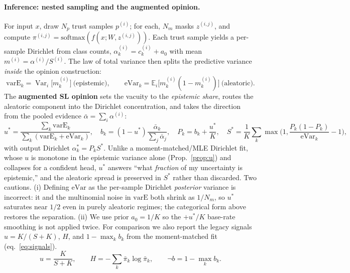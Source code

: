 \documentclass[11pt]{article}
\newcommand{\Eb}{\mathbb{E}}
\newcommand{\Var}{\operatorname{Var}}
\begin{document}
\paragraph{Inference: nested sampling and the augmented opinion.}
For input $x$, draw $N_p$ trust samples $p^{(i)}$; for each, $N_m$ masks $z^{(i,j)}$, and
compute $\pi^{(i,j)}=\mathrm{softmax}(f(x;W,z^{(i,j)}))$. Each trust sample yields a
per-sample Dirichlet from class counts, $\alpha^{(i)}_k=c^{(i)}_k+a_0$ with mean
$m^{(i)}=\alpha^{(i)}/S^{(i)}$. The law of total variance then splits the predictive
variance \emph{inside} the opinion construction:
\begin{equation}
\mathrm{varE}_k=\Var_i\big[m^{(i)}_k\big]\ \text{(epistemic)},\qquad
\mathrm{eVar}_k=\Eb_i\big[m^{(i)}_k(1-m^{(i)}_k)\big]\ \text{(aleatoric)}.
\end{equation}
The \textbf{augmented SL opinion} sets the vacuity to the \emph{epistemic share},
routes the aleatoric component into the Dirichlet concentration, and takes the
direction from the pooled evidence $\bar\alpha=\sum_i\alpha^{(i)}$:
\begin{equation}
u^\ast=\frac{\sum_k\mathrm{varE}_k}{\sum_k(\mathrm{varE}_k+\mathrm{eVar}_k)},\quad
b_k=(1-u^\ast)\frac{\bar\alpha_k}{\sum_j\bar\alpha_j},\quad
P_k=b_k+\frac{u^\ast}{K},\quad
S^\ast=\frac1K\sum_k\max\!\Big(1,\frac{P_k(1-P_k)}{\mathrm{eVar}_k}-1\Big),
\label{eq:augmented}
\end{equation}
with output Dirichlet $\alpha^\ast_k=P_kS^\ast$. Unlike a moment-matched/MLE
Dirichlet fit, whose $u$ is monotone in the epistemic variance alone
(Prop.~\ref{prop:u}) and collapses for a confident head, $u^\ast$ answers ``what
\emph{fraction} of my uncertainty is epistemic,'' and the aleatoric spread is
preserved in $S^\ast$ rather than discarded. Two cautions. (i) Defining
$\mathrm{eVar}$ as the per-sample Dirichlet \emph{posterior} variance is incorrect:
it and the multinomial noise in $\mathrm{varE}$ both shrink as $1/N_m$, so $u^\ast$
saturates near $1/2$ even in purely aleatoric regimes; the categorical form above
restores the separation. (ii) We use prior $a_0=1/K$ so the $+u^\ast/K$ base-rate
smoothing is not applied twice. For comparison we also report the legacy signals
$u=K/(S+K)$, $H$, and $1-\max_k b_k$ from the moment-matched fit
(eq.~\ref{eq:signals}).
\begin{equation}
u=\frac{K}{S+K},\qquad H=-\sum_k\bar\pi_k\log\bar\pi_k,\qquad \neg b=1-\max_k b_k.
\label{eq:signals}
\end{equation}
\end{document}
